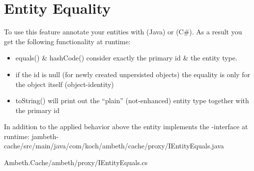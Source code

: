 \section{Entity Equality}
\label{feature:EntityEquals}
\ClearAPI
To use this feature annotate your entities with  (Java) or \type{[EntityEqualsAspect]} (C\#). As a result you get the following functionality at runtime:

\begin{itemize}
	\item equals() \& hashCode() consider exactly the primary id \& the entity type.
	\item if the id is null (for newly created unpersisted objects) the equality is only for the object itself (object-identity)
	\item toString() will print out the ``plain'' (not-enhanced) entity type together with the primary id
\end{itemize}


In addition to the applied behavior above the entity implements the -interface at runtime:
{jambeth-cache/src/main/java/com/koch/ambeth/cache/proxy/IEntityEquals.java}

{Ambeth.Cache/ambeth/proxy/IEntityEquals.cs}